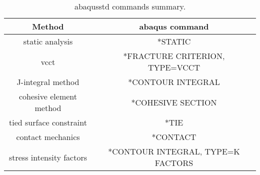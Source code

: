 \begin{table}[htbp]
  \centering
  \caption{\gls{abaqusstd} commands summary.}
    \begin{tabular}{cc}
    \toprule
  \textbf{Method}&  \textbf{\gls{abaqus} command}\\
    \midrule
static analysis&*STATIC\\
\acrshort{vcct}&*FRACTURE CRITERION, TYPE=VCCT\\
J-integral method&*CONTOUR INTEGRAL\\
cohesive element method&*COHESIVE SECTION\\
tied surface constraint&*TIE\\
contact mechanics&*CONTACT\\
stress intensity factors&*CONTOUR INTEGRAL, TYPE=K FACTORS\\
    \bottomrule
    \end{tabular}%
  \label{tab:command_tab}%
\end{table}%
